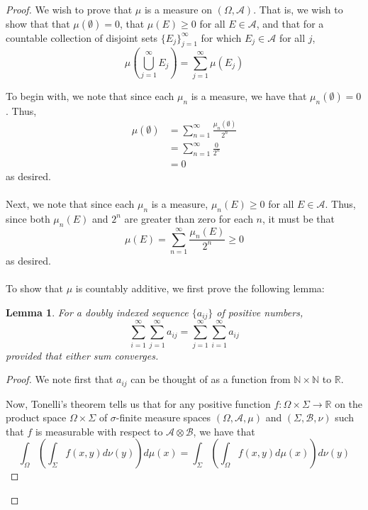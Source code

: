 \documentclass[fontsize=11pt]{scrartcl} %
\numberwithin{equation}{section} %
\numberwithin{figure}{section} %
\numberwithin{table}{section} %
\newcommand{\R}{\mathbb{R}}
\newcommand{\N}{\mathbb{N}}
\newtheorem*{lemma}{Lemma}
\begin{document}
\begin{proof}
    We wish to prove that $\mu$ is a measure on $(\Omega,\mathscr{A})$. That is,
    we wish to show that that $\mu(\emptyset) = 0$, that $\mu(E)\geq 0$ for all
    $E\in\mathscr{A}$, and that for a countable collection of disjoint sets
    $\{E_j\}_{j=1}^{\infty}$ for which $E_j\in\mathscr{A}$ for all $j$,
    \[
        \mu\left(\bigcup_{j=1}^{\infty}E_j\right) = \sum_{j=1}^{\infty}\mu(E_j)
    \]

    To begin with, we note that since each $\mu_n$ is a measure, we have that
    $\mu_n(\emptyset) = 0$.
    Thus,
    \[
        \begin{aligned}
            \mu(\emptyset)  &= \sum_{n=1}^{\infty}\frac{\mu_n(\emptyset)}{2^n}\\
                            &= \sum_{n=1}^{\infty}\frac{0}{2^n}\\
                            &=0
        \end{aligned}
    \]
    as desired.
    \\
    \\
    Next, we note that since each $\mu_n$ is a measure, $\mu_n(E)\geq 0$ for all
    $E\in\mathscr{A}$. Thus, since both $\mu_n(E)$ and $2^n$ are greater than
    zero for each $n$, it must be that 
    \[
        \mu(E) = \sum_{n=1}^{\infty}\frac{\mu_n(E)}{2^n} \geq 0
    \]
    as desired.
    \\
    \\
    To show that $\mu$ is countably additive, we first prove the following lemma:
    \begin{lemma}
        For a doubly indexed sequence $\{a_{ij}\}$ of positive numbers,
        \[
            \sum_{i=1}^{\infty}\sum_{j=1}^{\infty}a_{ij} =
            \sum_{j=1}^{\infty}\sum_{i=1}^{\infty}a_{ij}
        \]
        provided that either sum converges.
    \end{lemma}
    \begin{proof}
        We note first that $a_{ij}$ can be thought of as a function from
        $\N\times \N$ to $\R$. 
        
        Now, Tonelli's theorem tells us that for any positive function
        $f:\Omega\times\Sigma\to\R$ on the product space $\Omega\times\Sigma$
        of $\sigma$-finite measure spaces $(\Omega,\mathscr{A},\mu)$ and
        $(\Sigma,\mathscr{B},\nu)$ such that $f$ is measurable with respect to
        $\mathscr{A}\otimes\mathscr{B}$, we have that
        \[
            \int_{\Omega}\left(\int_{\Sigma}f(x,y)d\nu(y)\right)d\mu(x) =
            \int_{\Sigma}\left(\int_{\Omega}f(x,y)d\mu(x)\right)d\nu(y)
        \]


\end{proof}
\end{proof}
\end{document}
